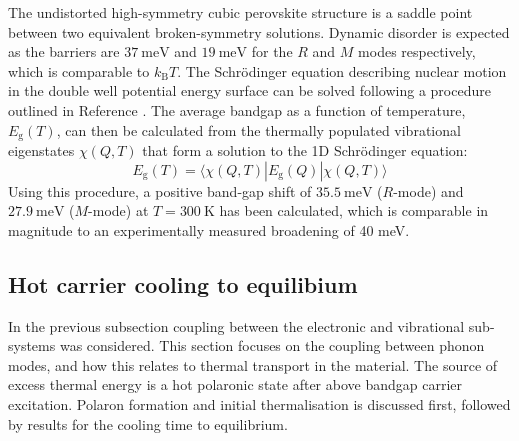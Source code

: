 \begin{table}
The undistorted high-symmetry cubic perovskite structure is a saddle point between two equivalent broken-symmetry solutions. Dynamic disorder is expected as the barriers are $37\ \textrm{meV}$ and $19\ \textrm{meV}$ for the $R$ and $M$ modes respectively, which is comparable to $k_\mathrm{B}T$. %
The Schr\"{o}dinger equation describing nuclear motion in the double well potential energy surface can be solved following a procedure outlined in Reference \cite{Skelton2016a}. %
The average bandgap as a function of temperature, $E_\mathrm{g}(T)$, can then be calculated from the thermally populated vibrational eigenstates $\chi(Q,T)$ that form a solution to the 1D Schr\"{o}dinger equation:
\begin{equation}
E_\mathrm{g}(T) = \langle \chi(Q,T)|E_\mathrm{g}(Q)|\chi(Q,T) \rangle
\end{equation}
Using this procedure, a positive band-gap shift of $35.5\ \textrm{meV}$ ($R$-mode) and $27.9\ \textrm{meV}$ ($M$-mode) at $T=300\ \textrm{K}$ has been calculated, which is comparable in magnitude to an experimentally measured broadening of 40 meV.\autocite{Wright2016} 

\subsection{Hot carrier cooling to equilibium} \label{ch5:epcoupling}
In the previous subsection coupling between the electronic and vibrational sub-systems was considered. This section focuses on the coupling between phonon modes, and how this relates to thermal transport in the material. The source of excess thermal energy is a hot polaronic state after above bandgap carrier excitation. Polaron formation and initial thermalisation is discussed first, followed by results for the cooling time to equilibrium.


\end{table}

